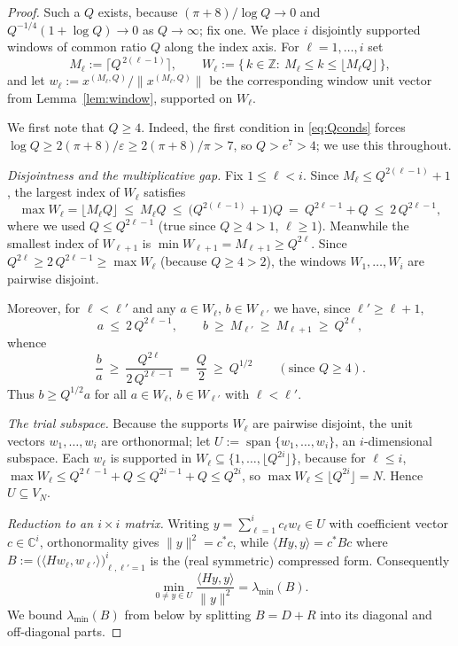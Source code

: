 \documentclass[12pt]{article}
\theoremstyle{remark}
\begin{document}
\begin{proof}
Such a $Q$ exists, because $(\pi+8)/\log Q\to0$ and $Q^{-1/4}(1+\log Q)\to0$ as $Q\to\infty$; fix
one. We place $i$ disjointly supported windows of common ratio $Q$ along the index axis. For
$\ell=1,\dots,i$ set
\[
M_\ell:=\bigl\lceil Q^{\,2(\ell-1)}\bigr\rceil,\qquad
W_\ell:=\{\,k\in\mathbb Z:\ M_\ell\le k\le \lfloor M_\ell Q\rfloor\,\},
\]
and let $w_\ell:=x^{(M_\ell,Q)}/\|x^{(M_\ell,Q)}\|$ be the corresponding window unit vector from
Lemma~\ref{lem:window}, supported on $W_\ell$.

We first note that $Q\ge4$. Indeed, the first condition in \eqref{eq:Qconds} forces
$\log Q\ge 2(\pi+8)/\varepsilon\ge 2(\pi+8)/\pi>7$, so $Q>e^{7}>4$; we use this throughout.

\smallskip
\noindent\emph{Disjointness and the multiplicative gap.} Fix $1\le\ell<i$. Since
$M_\ell\le Q^{2(\ell-1)}+1$, the largest index of $W_\ell$ satisfies
\[
\max W_\ell=\lfloor M_\ell Q\rfloor\ \le\ M_\ell Q\ \le\ \bigl(Q^{2(\ell-1)}+1\bigr)Q
\ =\ Q^{2\ell-1}+Q\ \le\ 2\,Q^{2\ell-1},
\]
where we used $Q\le Q^{2\ell-1}$ (true since $Q\ge4>1$, $\ell\ge1$). Meanwhile the smallest index
of $W_{\ell+1}$ is $\min W_{\ell+1}=M_{\ell+1}\ge Q^{2\ell}$. Since
$Q^{2\ell}\ge 2\,Q^{2\ell-1}\ge\max W_\ell$ (because $Q\ge4>2$), the windows
$W_1,\dots,W_i$ are pairwise disjoint.

Moreover, for $\ell<\ell'$ and any $a\in W_\ell$, $b\in W_{\ell'}$ we have, since $\ell'\ge\ell+1$,
\begin{equation}\label{eq:gap}
a\ \le\ 2\,Q^{2\ell-1},\qquad
b\ \ge\ M_{\ell'}\ \ge\ M_{\ell+1}\ \ge\ Q^{2\ell},
\end{equation}
whence
\begin{equation}\label{eq:bovera}
\frac ba\ \ge\ \frac{Q^{2\ell}}{2\,Q^{2\ell-1}}\ =\ \frac Q2\ \ge\ Q^{1/2}\qquad(\text{since }Q\ge4).
\end{equation}
Thus $b\ge Q^{1/2}a$ for all $a\in W_\ell,\ b\in W_{\ell'}$ with $\ell<\ell'$.

\smallskip
\noindent\emph{The trial subspace.} Because the supports $W_\ell$ are pairwise disjoint, the unit
vectors $w_1,\dots,w_i$ are orthonormal; let $U:=\operatorname{span}\{w_1,\dots,w_i\}$, an
$i$-dimensional subspace. Each $w_\ell$ is supported in
$W_\ell\subseteq\{1,\dots,\lfloor Q^{2i}\rfloor\}$, because for $\ell\le i$,
$\max W_\ell\le Q^{2\ell-1}+Q\le Q^{2i-1}+Q\le Q^{2i}$, so $\max W_\ell\le\lfloor Q^{2i}\rfloor=N$.
Hence $U\subseteq V_N$.

\smallskip
\noindent\emph{Reduction to an $i\times i$ matrix.} Writing $y=\sum_{\ell=1}^i c_\ell w_\ell\in U$
with coefficient vector $c\in\mathbb C^i$, orthonormality gives $\|y\|^2=c^*c$, while
$\langle Hy,y\rangle=c^*Bc$ where
$B:=\bigl(\langle Hw_\ell,w_{\ell'}\rangle\bigr)_{\ell,\ell'=1}^i$ is the (real symmetric)
compressed form. Consequently
\begin{equation}\label{eq:minU}
\min_{0\ne y\in U}\frac{\langle Hy,y\rangle}{\|y\|^2}=\lambda_{\min}(B).
\end{equation}
We bound $\lambda_{\min}(B)$ from below by splitting $B=D+R$ into its diagonal and off-diagonal
parts.


\end{proof}
\end{document}

